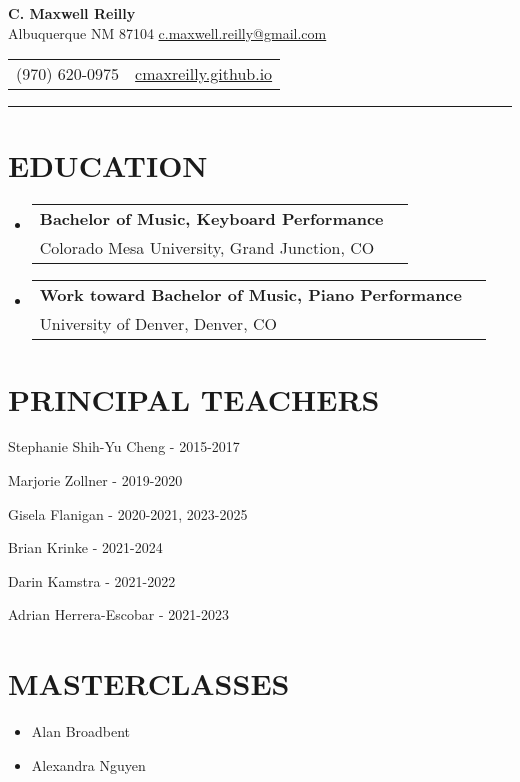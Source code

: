 \documentclass{article}
\makeatletter
\newcommand{\cvItem}[1]{
        \item {
            {#1}
        }
    }
\newcommand{\cvSubHeadingListStart}{\begin{itemize}[leftmargin=0pt]}
\newcommand{\cvSubHeadingListEnd}{\end{itemize}}
\newcommand{\cvItemListStart}{\begin{itemize}[leftmargin=10pt]}
\newcommand{\cvItemListEnd}{\end{itemize}}
\newcommand{\cvEducationSubheading}[2]{
        \vspace{-1pt}\item[]
            \begin{tabular*}{1\textwidth}[t]{l@{\extracolsep{\fill}}r}
                \textbf{#1} \\
                {#2} \\
            \end{tabular*}
    }
\makeatother
\begin{document}
    \begin{center}
        \textbf{\Large C. Maxwell Reilly} \\ Albuquerque NM 87104
        \href{mailto:c.maxwell.reilly@gmail.com}{c.maxwell.reilly@gmail.com}
    \end{center}\vspace{-11pt}
    \begin{center}
        \begin{tabular}{c c}
            (970) 620-0975 & \href{https://cmaxreilly.github.io}{cmaxreilly.github.io} \\
        \end{tabular}\vspace{-8pt}
    \end{center}
    \rule{\textwidth}{1pt}

    \section{EDUCATION}
        \cvSubHeadingListStart
            \cvEducationSubheading
                {Bachelor of Music, Keyboard Performance}
                {Colorado Mesa University, Grand Junction, CO}
            \cvEducationSubheading
                {Work toward Bachelor of Music, Piano Performance}
                {University of Denver, Denver, CO}
        \cvSubHeadingListEnd

    \section{PRINCIPAL TEACHERS}
        \cvItemListStart
            \begin{multicols}{2}
                \cvItem{Stephanie Shih-Yu Cheng - 2015-2017}
                \cvItem{Marjorie Zollner - 2019-2020}
                \cvItem{Gisela Flanigan - 2020-2021, 2023-2025} 
                \cvItem{Brian Krinke - 2021-2024}
                \cvItem{Darin Kamstra - 2021-2022}
                \cvItem{Adrian Herrera-Escobar - 2021-2023}
            \end{multicols}
        \cvItemListEnd

    \section{MASTERCLASSES}
        \cvItemListStart
            \cvItem{Alan Broadbent}
            \cvItem{Alexandra Nguyen}
        \cvItemListEnd
\end{document}
